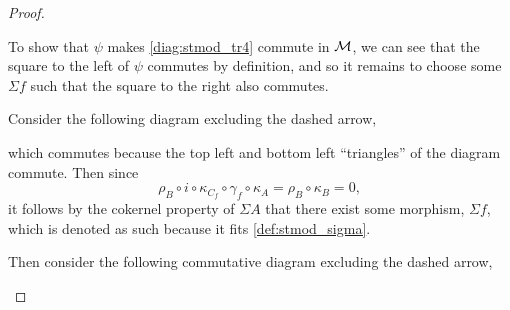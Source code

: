\begin{proof}
\begin{enumerate}[label={(\bfseries TR\arabic*)}]
{            To show that \( \psi \) makes \autoref{diag:stmod_tr4} commute in \( {\mathcal{M}} \), we can see that the square to the left of \( \psi \) commutes by definition, and so it remains to choose some \( \Sigma f \) such that the square to the right also commutes.

            Consider the following diagram excluding the dashed arrow,
            \begin{center}
            \end{center}
            which commutes because the top left and bottom left ``triangles'' of the diagram commute. Then since
            \[
                \rho_B \circ i \circ \kappa_{C_f} \circ \gamma_f \circ \kappa_A = \rho_B \circ \kappa_B = 0,
            \]
            it follows by the cokernel property of \( \Sigma A \) that there exist some morphism, \( \Sigma f \), which is denoted as such because it fits \autoref{def:stmod_sigma}.

            Then consider the following commutative diagram excluding the dashed arrow,
            \begin{center}
\end{center}}
\end{enumerate}
\end{proof}
